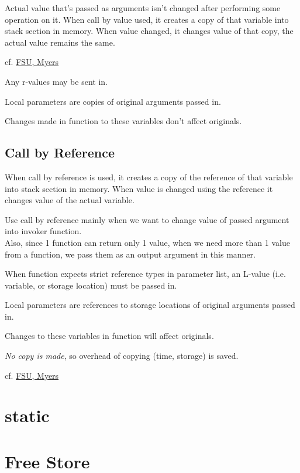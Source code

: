 \documentclass[10pt]{amsart}
\begin{document}
\begin{multicols*}{2}
Actual value that's passed as arguments isn't changed after performing some operation on it. When call by value used, it creates a copy of that variable into stack section in memory. When value changed, it changes value of that copy, the actual value remains the same.

cf. \href{https://www.cs.fsu.edu/~myers/c++/notes/references.html}{FSU, Myers}

Any r-values may be sent in.

Local parameters are copies of original arguments passed in.

Changes made in function to these variables don't affect originals.

\subsection{Call by Reference}

When call by reference is used, it creates a copy of the reference of that variable into stack section in memory. When value is changed using the reference it changes value of the actual variable.

Use call by reference mainly when we want to change value of passed argument into invoker function.\\
Also, since 1 function can return only 1 value, when we need more than 1 value from a function, we pass them as an output argument in this manner.

When function expects strict reference types in parameter list, an L-value (i.e. variable, or storage location) must be passed in.

Local parameters are references to storage locations of original arguments passed in.

Changes to these variables in function will affect originals.

\emph{No copy is made}, so overhead of copying (time, storage) is saved.

cf. \href{https://www.cs.fsu.edu/~myers/c++/notes/references.html}{FSU, Myers}


\section{static}



\section{Free Store}  



\end{multicols*}
\end{document}
